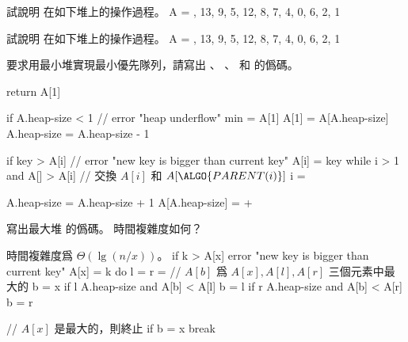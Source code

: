 \startsection[
  title={Priority queues},
]

\startEXERCISE
試說明  在如下堆上的操作過程。
\startformula
A = , 13, 9, 5, 12, 8, 7, 4, 0, 6, 2, 1 \rangle
\stopformula
\stopEXERCISE

\startANSWER
\startcombination[2*2]
{\externalfigure[output/e6_5_1-1]}{}
{\externalfigure[output/e6_5_1-2]}{}
{\externalfigure[output/e6_5_1-3]}{}
\stopcombination
\stopANSWER

\startEXERCISE
試說明  在如下堆上的操作過程。
\startformula
A = , 13, 9, 5, 12, 8, 7, 4, 0, 6, 2, 1 \rangle
\stopformula
\stopEXERCISE

\startANSWER
\startcombination[2*2]
{\externalfigure[output/e6_5_2-1]}{}
{\externalfigure[output/e6_5_2-2]}{}
{\externalfigure[output/e6_5_2-3]}{}
\stopcombination
\stopANSWER

\startEXERCISE
要求用最小堆實現最小優先隊列，請寫出
、
、
 和  的僞碼。
\stopEXERCISE

\startANSWER
{}
\startCLRSCODE
return A[1]
\stopCLRSCODE

\startCLRSCODE
if A.heap-size < 1
	// error "heap underflow"
min = A[1]
A[1] = A[A.heap-size]
A.heap-size = A.heap-size - 1
\stopCLRSCODE

\startCLRSCODE
if key > A[i]
	// error "new key is bigger than current key"
A[i] = key
while i > 1 and A[] > A[i]
	// 交換 $A[i]$ 和 $A[\ALGO{PARENT(i)}]$
	i = 
\stopCLRSCODE

\startCLRSCODE
A.heap-size = A.heap-size + 1
A[A.heap-size] = +\infty
{}
\stopCLRSCODE
\stopANSWER

\startEXERCISE
寫出最大堆  的僞碼。
時間複雜度如何？
\stopEXERCISE

\startANSWER
時間複雜度爲 $\Theta(\lg (n/x))$。
\startCLRSCODE
if k > A[x]
	error "new key is bigger than current key"
A[x] = k
do
	l = 
	r = 
	// $A[b]$ 爲 $A[x],A[l],A[r]$ 三個元素中最大的
	b = x
	if l \le A.heap-size and A[b] < A[l]
		b = l
	if r \le A.heap-size and A[b] < A[r]
		b = r

	// $A[x]$ 是最大的，則終止
	if b = x
		break

